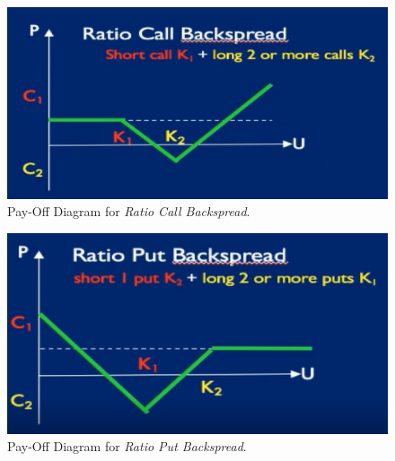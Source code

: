 \documentclass[11pt,a4paper]{article}
\begin{document}
    \begin{figure}[ht!]
      \centering
      \includegraphics[width=.5\textwidth]{ratioCallBackspread.PNG}
      \caption{Pay-Off Diagram for \textit{Ratio Call Backspread}.}
      \label{fig_RatioCallBackspread}
    \end{figure}

    \begin{figure}[ht!]
      \centering
      \includegraphics[width=.5\textwidth]{ratioPutBackspread.PNG}
      \caption{Pay-Off Diagram for \textit{Ratio Put Backspread}.}
      \label{fig_RatioPutBackspread}
    \end{figure}
\end{document}
